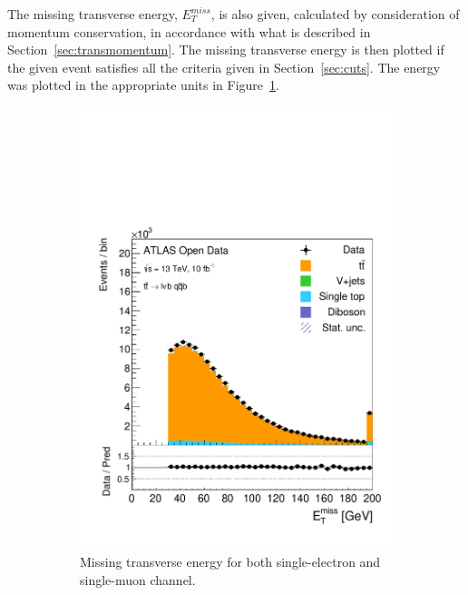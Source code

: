 \documentclass[12pt,a4paper]{article}
\numberwithin{equation}{section}
\begin{document}
The missing transverse energy, $E_T^{miss}$, is also given, calculated by
consideration of momentum conservation, in accordance with what is described in
Section~\ref{sec:transmomentum}. The missing transverse energy is then plotted
if the given event satisfies all the criteria given in Section~\ref{sec:cuts}.
The energy was plotted in the appropriate units in Figure~\ref{fig:etmiss}.\\

\begin{figure}[t!]
    \centering
    \begin{subfigure}[t]{0.47\textwidth}
      \centering
      \includegraphics[width=1.0\textwidth]{figures/hist_etmiss}
      \caption{\label{fig:etmiss}Missing transverse energy for both
        single-electron and single-muon channel.}
    \end{subfigure}%
      \hfill{}
    \begin{subfigure}[t]{0.47\textwidth}

\end{subfigure}
\end{figure}
\end{document}
